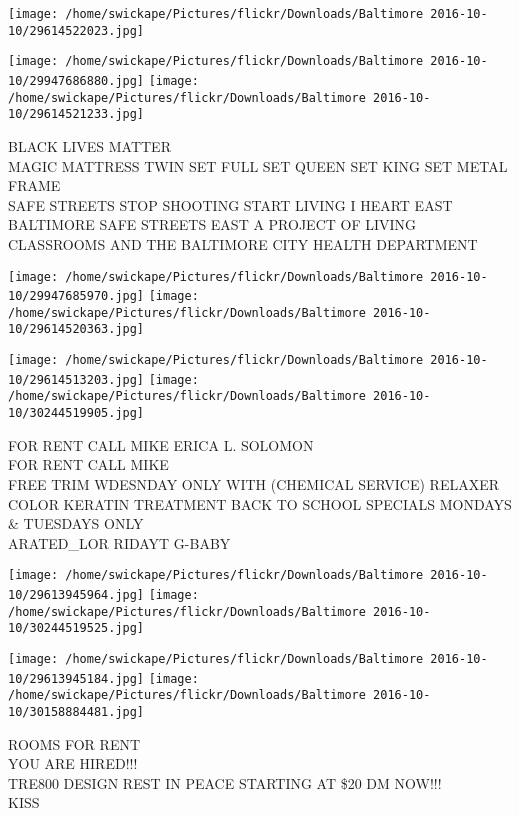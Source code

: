 \documentclass[10pt,letterpaper]{article}
\begin{document}
\texttt{[image: /home/swickape/Pictures/flickr/Downloads/Baltimore 2016-10-10/29614522023.jpg]}

\vspace{0.25in}
\texttt{[image: /home/swickape/Pictures/flickr/Downloads/Baltimore 2016-10-10/29947686880.jpg]}
\texttt{[image: /home/swickape/Pictures/flickr/Downloads/Baltimore 2016-10-10/29614521233.jpg]}

BLACK LIVES MATTER\\
MAGIC MATTRESS TWIN SET FULL SET QUEEN SET KING SET METAL FRAME\\
SAFE STREETS STOP SHOOTING START LIVING I HEART EAST BALTIMORE SAFE STREETS EAST A PROJECT OF LIVING CLASSROOMS AND THE BALTIMORE CITY HEALTH DEPARTMENT\\
\pagebreak

\texttt{[image: /home/swickape/Pictures/flickr/Downloads/Baltimore 2016-10-10/29947685970.jpg]}
\texttt{[image: /home/swickape/Pictures/flickr/Downloads/Baltimore 2016-10-10/29614520363.jpg]}

\texttt{[image: /home/swickape/Pictures/flickr/Downloads/Baltimore 2016-10-10/29614513203.jpg]}
\texttt{[image: /home/swickape/Pictures/flickr/Downloads/Baltimore 2016-10-10/30244519905.jpg]}

FOR RENT CALL MIKE ERICA L. SOLOMON\\
FOR RENT CALL MIKE\\
FREE TRIM WDESNDAY ONLY WITH (CHEMICAL SERVICE) RELAXER COLOR KERATIN TREATMENT BACK TO SCHOOL SPECIALS MONDAYS \& TUESDAYS ONLY\\
ARATED\_LOR RIDAYT G{-}BABY\\
\pagebreak

\texttt{[image: /home/swickape/Pictures/flickr/Downloads/Baltimore 2016-10-10/29613945964.jpg]}
\texttt{[image: /home/swickape/Pictures/flickr/Downloads/Baltimore 2016-10-10/30244519525.jpg]}

\texttt{[image: /home/swickape/Pictures/flickr/Downloads/Baltimore 2016-10-10/29613945184.jpg]}
\texttt{[image: /home/swickape/Pictures/flickr/Downloads/Baltimore 2016-10-10/30158884481.jpg]}

ROOMS FOR RENT\\
YOU ARE HIRED!!!\\
TRE800 DESIGN REST IN PEACE STARTING AT \$20 DM NOW!!!\\
KISS\\
\pagebreak
\end{document}
